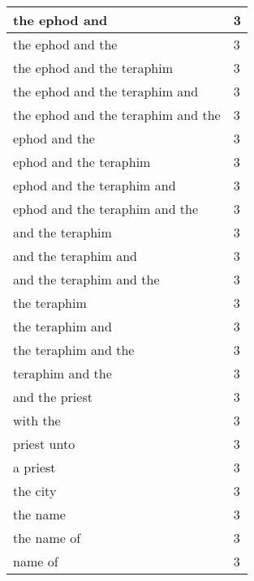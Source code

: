 \begin{center}
\begin{longtable}{|p{3.0in}|p{0.5in}|}
the ephod and & 3\\ \hline 
the ephod and the & 3\\ \hline 
the ephod and the teraphim & 3\\ \hline 
the ephod and the teraphim and & 3\\ \hline 
the ephod and the teraphim and the & 3\\ \hline 
ephod and the & 3\\ \hline 
ephod and the teraphim & 3\\ \hline 
ephod and the teraphim and & 3\\ \hline 
ephod and the teraphim and the & 3\\ \hline 
and the teraphim & 3\\ \hline 
and the teraphim and & 3\\ \hline 
and the teraphim and the & 3\\ \hline 
the teraphim & 3\\ \hline 
the teraphim and & 3\\ \hline 
the teraphim and the & 3\\ \hline 
teraphim and the & 3\\ \hline 
and the priest & 3\\ \hline 
with the & 3\\ \hline 
priest unto & 3\\ \hline 
a priest & 3\\ \hline 
the city & 3\\ \hline 
the name & 3\\ \hline 
the name of & 3\\ \hline 
name of & 3\\ \hline 
\end{longtable}
\end{center}





